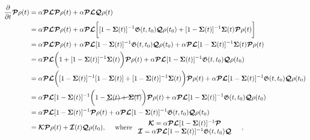 \documentclass{homework}
\begin{document}
\begin{equation}
\begin{split}
    \frac{\partial}{\partial t} \bm{\mathcal{P}}\rho(t) &= \alpha \bm{\mathcal{P}} \bm{\mathcal{L}} \bm{\mathcal{P}} \rho(t) + \alpha \bm{\mathcal{P}} \bm{\mathcal{L}} \bm{\mathcal{Q}} \rho(t) \\
    &= \alpha \bm{\mathcal{P}} \bm{\mathcal{L}} \bm{\mathcal{P}} \rho(t) + \alpha \bm{\mathcal{P}} \bm{\mathcal{L}} \bigg[[1-\bm{\Sigma}(t)]^{-1} \mathfrak{G}(t,t_0) \bm{\mathcal{Q}}\rho(t_0) + [1-\bm{\Sigma}(t)]^{-1}  \bm{\Sigma}(t) \bm{\mathcal{P}}\rho(t) \bigg] \\
    &= \alpha \bm{\mathcal{P}} \bm{\mathcal{L}} \bm{\mathcal{P}} \rho(t) + \alpha \bm{\mathcal{P}} \bm{\mathcal{L}} [1-\bm{\Sigma}(t)]^{-1} \mathfrak{G}(t,t_0) \bm{\mathcal{Q}}\rho(t_0) + \alpha \bm{\mathcal{P}} \bm{\mathcal{L}}  [1-\bm{\Sigma}(t)]^{-1}  \bm{\Sigma}(t) \bm{\mathcal{P}}\rho(t) \\
    &= \alpha \bm{\mathcal{P}} \bm{\mathcal{L}}\bigg( 1 +  [1-\bm{\Sigma}(t)]^{-1}  \bm{\Sigma}(t) \bigg)\bm{\mathcal{P}}\rho(t) + \alpha \bm{\mathcal{P}} \bm{\mathcal{L}} [1-\bm{\Sigma}(t)]^{-1} \mathfrak{G}(t,t_0) \bm{\mathcal{Q}}\rho(t_0) \\
    &= \alpha \bm{\mathcal{P}} \bm{\mathcal{L}}\bigg( [1-\bm{\Sigma}(t)]^{-1} [1-\bm{\Sigma}(t)] +  [1-\bm{\Sigma}(t)]^{-1} \bm{\Sigma}(t) \bigg)\bm{\mathcal{P}}\rho(t) + \alpha \bm{\mathcal{P}} \bm{\mathcal{L}} [1-\bm{\Sigma}(t)]^{-1} \mathfrak{G}(t,t_0) \bm{\mathcal{Q}}\rho(t_0) \\
    &= \alpha \bm{\mathcal{P}} \bm{\mathcal{L}} [1-\bm{\Sigma}(t)]^{-1}\bigg( 1-\cancel{\bm{\Sigma}(t) + \bm{\Sigma}(t)} \bigg)\bm{\mathcal{P}}\rho(t) + \alpha \bm{\mathcal{P}} \bm{\mathcal{L}} [1-\bm{\Sigma}(t)]^{-1} \mathfrak{G}(t,t_0) \bm{\mathcal{Q}}\rho(t_0) \\
    &= \alpha \bm{\mathcal{P}} \bm{\mathcal{L}}[1-\bm{\Sigma}(t)]^{-1}\bm{\mathcal{P}}\rho(t) + \alpha \bm{\mathcal{P}} \bm{\mathcal{L}} [1-\bm{\Sigma}(t)]^{-1} \mathfrak{G}(t,t_0) \bm{\mathcal{Q}}\rho(t_0) \\
    &= \bm{\mathcal{K}} \bm{\mathcal{P}}\rho(t) + \bm{\mathcal{I}}(t) \bm{\mathcal{Q}}\rho(t_0), \quad \textnormal{ where } \begin{array}{cc}
       \bm{\mathcal{K}} = \alpha \bm{\mathcal{P}} \bm{\mathcal{L}}[1-\bm{\Sigma}(t)]^{-1}\bm{\mathcal{P}}  &  \\
       \bm{\mathcal{I}} = \alpha \bm{\mathcal{P}} \bm{\mathcal{L}} [1-\bm{\Sigma}(t)]^{-1} \mathfrak{G}(t,t_0) \bm{\mathcal{Q}} & 
    \end{array},
    \label{TCL_final_eq}
\end{split}
\end{equation}
\end{document}
